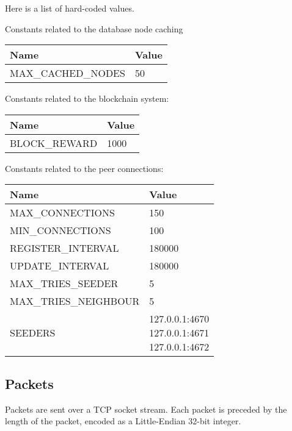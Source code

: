 \documentclass[../documentation.tex]{subfiles}
\begin{document}
Here is a list of hard-coded values.

Constants related to the database node caching

\bgroup{}
\def\arraystretch{1.25}
\begin{tabular}{|l|l|}
    \hline
    \textbf{Name} & \textbf{Value}
    \\ \hline
    MAX\_CACHED\_NODES & 50
    \\ \hline
\end{tabular}
\egroup{}

Constants related to the blockchain system:

\bgroup{}
\def\arraystretch{1.25}
\begin{tabular}{|l|l|}
    \hline
    \textbf{Name} & \textbf{Value}
    \\ \hline
    BLOCK\_REWARD & 1000
    \\ \hline
\end{tabular}
\egroup{}

Constants related to the peer connections:

\bgroup{}
\def\arraystretch{1.25}
\begin{tabular}{|l|l|}
    \hline
    \textbf{Name} & \textbf{Value}
    \\ \hline
    MAX\_CONNECTIONS & 150
    \\ \hline
    MIN\_CONNECTIONS & 100
    \\ \hline
    REGISTER\_INTERVAL & 180000
    \\ \hline
    UPDATE\_INTERVAL & 180000
    \\ \hline
    MAX\_TRIES\_SEEDER & 5
    \\ \hline
    MAX\_TRIES\_NEIGHBOUR & 5
    \\ \hline
    SEEDERS & \makecell[t] {
        127.0.0.1:4670 \\
        127.0.0.1:4671 \\
        127.0.0.1:4672
    }
    \\ \hline
\end{tabular}
\egroup{}

\hypertarget{packets}{}
\subsection{Packets}

Packets are sent over a TCP socket stream.
Each packet is preceded by the length of the packet,
encoded as a Little-Endian 32-bit integer.
\end{document}
